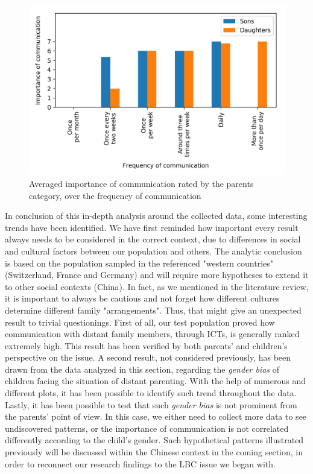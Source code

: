 \begin{figure}[ht]
    \centering
    \includegraphics[scale=0.58]{plots/plot_9.png}
    \caption{Averaged importance of communication rated by the parents category, over the frequency of communication}
    \label{fig:plot_9}
\end{figure}

In conclusion of this in-depth analysis around the collected data, some interesting trends have been identified. We have first reminded how important every result always needs to be considered in the correct context, due to differences in social and cultural factors between our population and others. The analytic conclusion is based on the population sampled in the referenced "western countries" (Switzerland, France and Germany) and will require more hypotheses to extend it to other social contexts (China). In fact, as we mentioned in the literature review, it is important to always be cautious and not forget how different cultures determine different family "arrangements". Thus, that might give an unexpected result to trivial questionings. 
First of all, our test population proved how communication with distant family members, through ICTs, is generally ranked extremely high. This result has been verified by both parents' and children's perspective on the issue. A second result, not considered previously, has been drawn from the data analyzed in this section, regarding the \textit{gender bias} of children facing the situation of distant parenting. With the help of numerous and different plots, it has been possible to identify such trend throughout the data. Lastly, it has been possible to test that such \textit{gender bias} is not prominent from the parents' point of view. In this case, we either need to collect more data to see undiscovered patterns, or the importance of communication is not correlated differently according to the child's gender. Such hypothetical patterns illustrated previously will be discussed within the Chinese context in the coming section, in order to reconnect our research findings to the LBC issue we began with.
 
